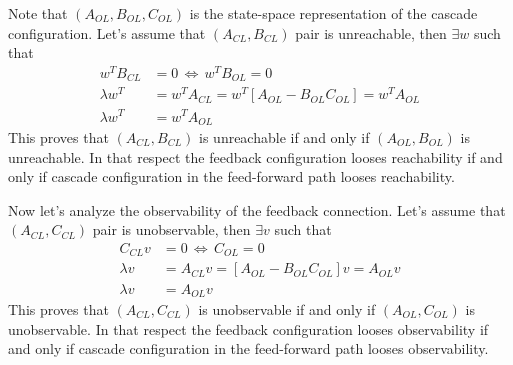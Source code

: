 \documentclass[twoside]{article}
\begin{document}
%
Note that $(A_{OL},B_{OL},C_{OL})$ is the state-space representation of the cascade configuration. 
Let's assume that $(A_{CL} , B_{CL})$ pair is unreachable, then $\exists w$ such that 
%
\begin{align*}
	w^T B_{CL} &= 0 \, \iff \, w^T B_{OL} = 0 
	\\
	\lambda w^T  &= w^T A_{CL} = w^T \left[ A_{OL} - B_{OL} C_{OL} \right] = w^T A_{OL}
	\\
	\lambda w^T &= w^T A_{OL}
\end{align*}
%
This proves that $(A_{CL} , B_{CL})$ is unreachable if and only if $(A_{OL} , B_{OL})$ is unreachable. 
In that respect the feedback configuration looses reachability if and only if cascade configuration in the 
feed-forward path looses reachability.

Now let's analyze the observability of the feedback connection. Let's assume that $(A_{CL} , C_{CL})$ pair is unobservable, then $\exists v$ such that 
%
\begin{align*}
	C_{CL} v &= 0 \, \iff \, C_{OL} = 0 
	\\
	\lambda v  &= A_{CL} v = \left[ A_{OL} - B_{OL} C_{OL} \right] v = A_{OL} v
	\\
	\lambda v &= A_{OL} v
\end{align*}
%
This proves that $(A_{CL} , C_{CL})$ is unobservable if and only if $(A_{OL} , C_{OL})$ is unobservable.
In that respect the feedback configuration looses observability if and only if cascade configuration in the 
feed-forward path looses observability.







\end{document}
